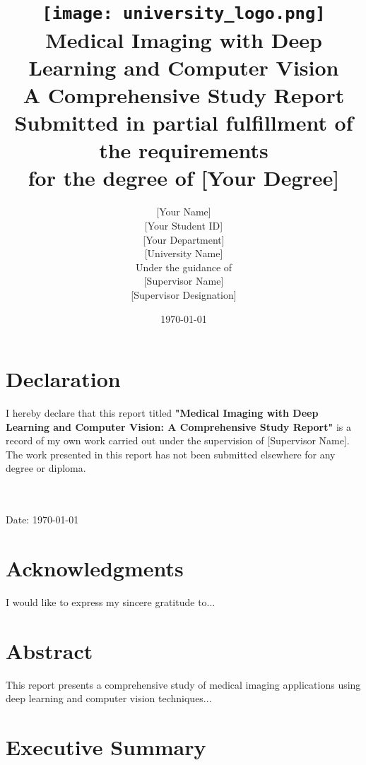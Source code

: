 \documentclass[12pt,a4paper]{report}
\title{
    \vspace{-2cm}
    \texttt{[image: university\_logo.png]} \\[1cm] %
    \Large\textbf{Medical Imaging with Deep Learning and Computer Vision} \\[0.5cm]
    \Large\textbf{A Comprehensive Study Report} \\[1cm]
    \normalsize Submitted in partial fulfillment of the requirements \\
    for the degree of [Your Degree] \\[1cm]
}
\author{
    \Large [Your Name] \\[0.3cm]
    \normalsize [Your Student ID] \\[0.3cm]
    \normalsize [Your Department] \\[0.3cm]
    \normalsize [University Name] \\[1cm]
    \normalsize Under the guidance of \\[0.3cm]
    \Large [Supervisor Name] \\[0.3cm]
    \normalsize [Supervisor Designation]
}
\date{\today}
\begin{document}
\maketitle

\chapter*{Declaration}

I hereby declare that this report titled \textbf{"Medical Imaging with Deep Learning and Computer Vision: A Comprehensive Study Report"} is a record of my own work carried out under the supervision of [Supervisor Name]. The work presented in this report has not been submitted elsewhere for any degree or diploma.

\vspace{2cm}
\begin{flushright}
 \\
[Your Student ID] \\
Date: \today
\end{flushright}

\chapter*{Acknowledgments}

I would like to express my sincere gratitude to...

\chapter*{Abstract}

This report presents a comprehensive study of medical imaging applications using deep learning and computer vision techniques...

\tableofcontents

\listoffigures

\listoftables

\listofalgorithms

\chapter{Executive Summary}
\end{document}
